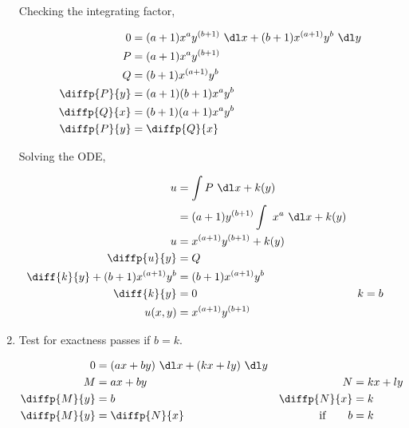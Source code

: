 \begin{enumerate}
          Checking the integrating factor,

          \begin{align}
              0            & = (a+1)x^{a}y^{(b+1)}\ \dl x + (b+1)x^{(a+1)}y^{b}
              \ \dl y                                                           \\
              P            & = (a+1)x^{a}y^{(b+1)}                              \\
              Q            & = (b+1)x^{(a+1)}y^{b}                              \\
              \diffp{P}{y} & = (a+1)(b+1)x^{a}y^{b}                             \\
              \diffp{Q}{x} & = (b+1)(a+1)x^{a}y^{b}                             \\
              \diffp{P}{y} & = \diffp{Q}{x}
          \end{align}

          Solving the ODE,

          \begin{align}
              u                                 & = \int P\ \dl x + k(y)        \\
                                                & = (a+1)y^{(b+1)}\int\ x^{a}
              \ \dl x + k(y)                                                    \\
              u                                 & = x^{(a+1)}y^{(b+1)} + k(y)   \\
              \diffp{u}{y}                      & = Q                           \\
              \diff{k}{y} + (b+1)x^{(a+1)}y^{b} & = (b+1)x^{(a+1)}y^{b}         \\
              \diff{k}{y}                       & = 0                         &
              k                                 & = b                           \\
              u(x, y)                           & = x^{(a+1)}y^{(b+1)}
          \end{align}


    \item Test for exactness passes if $ b = k $.

          \begin{align}
              0                   & = (ax + by)\ \dl x + (kx + ly)\ \dl y   \\
              M                   & = ax+by                               &
              N                   & = kx+ly                                 \\
              \diffp{M}{y}        & = b                                   &
              \diffp{N}{x}        & = k                                     \\
              \diffp{M}{y}        & = \diffp{N}{x}                        &
              \text{if}\qquad   b & = k
          \end{align}


\end{enumerate}
